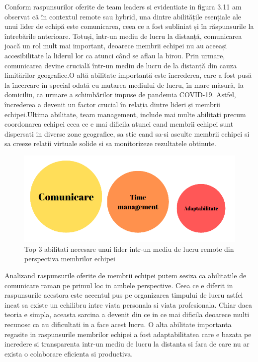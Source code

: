 \documentclass[a4paper, 12pt]{article}
\begin{document}
	\quad Conform raspunsurilor oferite de team leaders si evidentiate in figura 3.11 am observat că în contextul remote sau hybrid, una dintre abilitățile esențiale ale unui lider de echipă este comunicarea, ceea ce a fost subliniat și în răspunsurile la întrebările anterioare. Totuși, într-un mediu de lucru la distanță, comunicarea joacă un rol mult mai important, deoarece membrii echipei nu au aceeași accesibilitate la liderul lor ca atunci când se aflau la birou. Prin urmare, comunicarea devine crucială într-un mediu de lucru de la distanță din cauza limitărilor geografice.O altă abilitate importantă este încrederea, care a fost pusă la încercare în special odată cu mutarea mediului de lucru, în mare măsură, la domiciliu, ca urmare a schimbărilor impuse de pandemia COVID-19. Astfel, încrederea a devenit un factor crucial în relația dintre lideri și membrii echipei.Ultima abilitate, team management, include mai multe abilitati precum coordonarea echipei ceea ce e mai dificila atunci cand membrii echipei sunt dispersati in diverse zone geografice, sa stie cand sa-si asculte membrii echipei si sa creeze relatii virtuale solide si sa monitorizeze rezultatele obtinute. 
	
	\quad \begin{figure}[!htb]
			\centering
			\includegraphics[width=15cm, height=6 cm]{"figures/team members- remote.png"}
			\caption {Top 3 abilitati necesare unui lider intr-un mediu de lucru remote din perspectiva membrilor echipei}\label{fig:four}
			
		\end{figure}

	\quad Analizand raspunsurile oferite de membrii echipei putem sesiza ca abilitatile de comunicare raman pe primul loc in ambele perspective. Ceea ce e diferit in raspunsurile acestora este accentul pus pe organizarea timpului de lucru astfel incat sa existe un echilibru intre viata personala si viata profesionala. Chiar daca teoria e simpla, aceasta sarcina a devenit din ce in ce mai dificila deoarece multi recunosc ca au dificultati in a face acest lucru. O alta abilitate importanta regasite in raspunsurile membrilor echipei a fost adaptabilitatea care e bazata pe incredere si transparenta intr-un mediu de lucru la distanta si fara de care nu ar exista o colaborare eficienta si productiva.
\end{document}
